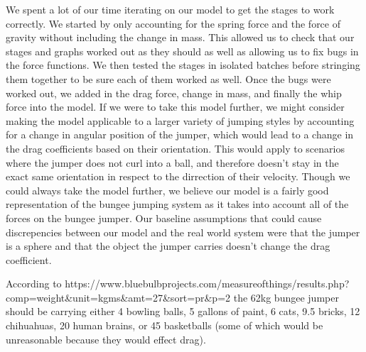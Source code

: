 \documentclass[11pt]{article}
\begin{document}
We spent a lot of our time iterating on our model to get the stages to
work correctly. We started by only accounting for the spring force and
the force of gravity without including the change in mass. This allowed
us to check that our stages and graphs worked out as they should as well
as allowing us to fix bugs in the force functions. We then tested the
stages in isolated batches before stringing them together to be sure
each of them worked as well. Once the bugs were worked out, we added in
the drag force, change in mass, and finally the whip force into the
model. If we were to take this model further, we might consider making
the model applicable to a larger variety of jumping styles by accounting
for a change in angular position of the jumper, which would lead to a
change in the drag coefficients based on their orientation. This would
apply to scenarios where the jumper does not curl into a ball, and
therefore doesn't stay in the exact same orientation in respect to the
dirrection of their velocity. Though we could always take the model
further, we believe our model is a fairly good representation of the
bungee jumping system as it takes into account all of the forces on the
bungee jumper. Our baseline assumptions that could cause discrepencies
between our model and the real world system were that the jumper is a
sphere and that the object the jumper carries doesn't change the drag
coefficient.

According to
https://www.bluebulbprojects.com/measureofthings/results.php?comp=weight\&unit=kgms\&amt=27\&sort=pr\&p=2
the 62kg bungee jumper should be carrying either 4 bowling balls, 5
gallons of paint, 6 cats, 9.5 bricks, 12 chihuahuas, 20 human brains, or
45 basketballs (some of which would be unreasonable because they would
effect drag).


    
    
    
    
\end{document}
